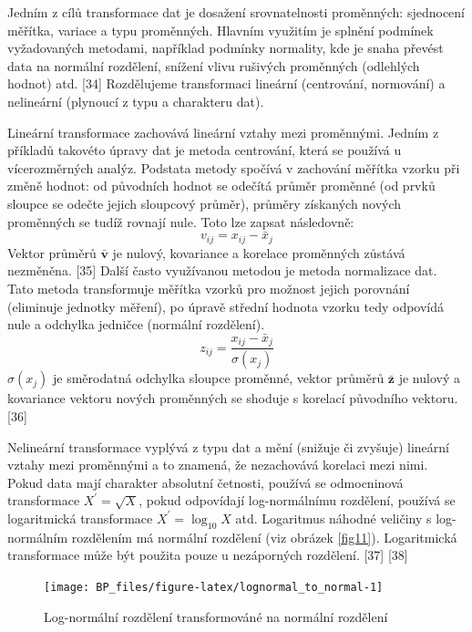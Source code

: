 \documentclass[12pt,]{article}
\begin{document}
\qquad Jedním z cílů transformace dat je dosažení srovnatelnosti
proměnných: sjednocení měřítka, variace a typu proměnných. Hlavním
využitím je splnění podmínek vyžadovaných metodami, například podmínky
normality, kde je snaha převést data na normální rozdělení, snížení
vlivu rušivých proměnných (odlehlých hodnot) atd. {[}34{]} Rozdělujeme
transformaci lineární (centrování, normování) a nelineární (plynoucí z
typu a charakteru dat).

\qquad Lineární transformace zachovává lineární vztahy mezi proměnnými.
Jedním z příkladů takovéto úpravy dat je metoda centrování, která se
používá u vícerozměrných analýz. Podstata metody spočívá v zachování
měřítka vzorku při změně hodnot: od původních hodnot se odečítá průměr
proměnné (od prvků sloupce se odečte jejich sloupcový průměr), průměry
získaných nových proměnných se tudíž rovnají nule. Toto lze zapsat
následovně: \[v_{ij} = x_{ij} - \bar{x}_j\] Vektor průměrů
\(\bar{\bm{v}}\) je nulový, kovariance a korelace proměnných zůstává
nezměněna. {[}35{]} Další často využívanou metodou je metoda normalizace
dat. Tato metoda transformuje měřítka vzorků pro možnost jejich
porovnání (eliminuje jednotky měření), po úpravě střední hodnota vzorku
tedy odpovídá nule a odchylka jedničce (normální rozdělení).
\[z_{ij} = \frac{x_{ij} - \bar{x}_j}{\sigma(x_j)}\] \(\sigma(x_j)\) je
směrodatná odchylka sloupce proměnné, vektor průměrů \(\bar{\bm{z}}\) je
nulový a kovariance vektoru nových proměnných se shoduje s korelací
původního vektoru. {[}36{]}

\qquad Nelineární transformace vyplývá z typu dat a mění (snižuje či
zvyšuje) lineární vztahy mezi proměnnými a to znamená, že nezachovává
korelaci mezi nimi. Pokud data mají charakter absolutní četnosti,
používá se odmocninová transformace \(X^{\prime} = \sqrt{X}\), pokud
odpovídají log-normálnímu rozdělení, používá se logaritmická
transformace \(X^{\prime} = \log_{10}X\) atd. Logaritmus náhodné
veličiny s log-normálním rozdělením má normální rozdělení (viz obrázek
\ref{fig11}). Logaritmická transformace může být použita pouze u
nezáporných rozdělení. {[}37{]} {[}38{]}

\begin{figure}[H]

{\centering \texttt{[image: BP\_files/figure-latex/lognormal\_to\_normal-1]} 

}

\caption{\label{fig11} Log-normální rozdělení transformováné na normální rozdělení}\label{fig:lognormal_to_normal}
\end{figure}
\end{document}
